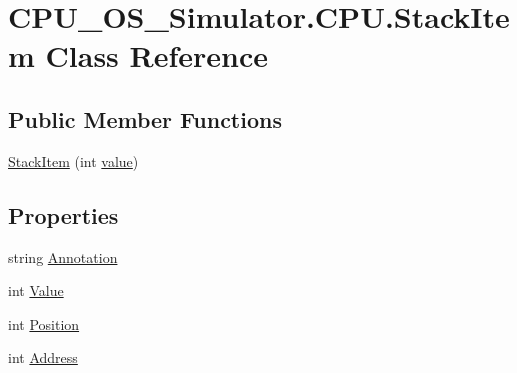 \hypertarget{class_c_p_u___o_s___simulator_1_1_c_p_u_1_1_stack_item}{}\section{C\+P\+U\+\_\+\+O\+S\+\_\+\+Simulator.\+C\+P\+U.\+Stack\+Item Class Reference}
\label{class_c_p_u___o_s___simulator_1_1_c_p_u_1_1_stack_item}
\subsection*{Public Member Functions}
\begin{DoxyCompactItemize}
\item 
\hyperlink{class_c_p_u___o_s___simulator_1_1_c_p_u_1_1_stack_item_a7925b78a92c2561df2396e93b858147d}{Stack\+Item} (int \hyperlink{class_c_p_u___o_s___simulator_1_1_c_p_u_1_1_stack_item_a114a8ae5aae9b8c45e2e0c36ce856cd2}{value})
\end{DoxyCompactItemize}
\subsection*{Properties}
\begin{DoxyCompactItemize}
\item 
string \hyperlink{class_c_p_u___o_s___simulator_1_1_c_p_u_1_1_stack_item_a13f182fa7a19bcb7d78aadbd4cc04c98}{Annotation}
\item 
int \hyperlink{class_c_p_u___o_s___simulator_1_1_c_p_u_1_1_stack_item_ac8e518e9111640d56d59efbff2fa3161}{Value}
\item 
int \hyperlink{class_c_p_u___o_s___simulator_1_1_c_p_u_1_1_stack_item_aa2e46f703d2a81a32d38f12df3718909}{Position}
\item 
int \hyperlink{class_c_p_u___o_s___simulator_1_1_c_p_u_1_1_stack_item_a44f4c5bd346e25e81c54b01012768bc5}{Address}
\end{DoxyCompactItemize}
